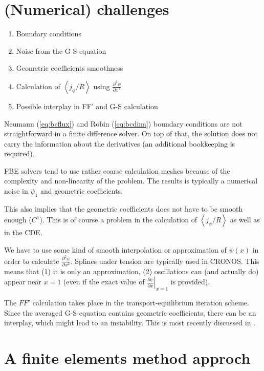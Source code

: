 \section{(Numerical) challenges}

\begin{enumerate}
\item Boundary conditions
\item Noise from the G-S equation
\item Geometric coefficients smoothness
\item Calculation of $\left\langle {{j_\phi }/R} \right\rangle$ using $\frac{{{\partial ^2}\psi }}{{\partial {x^2}}}$
\item Possible interplay in FF' and G-S calculation
\end{enumerate}

Neumann (\ref{eq:bcflux}) and Robin (\ref{eq:bcdina}) boundary conditions
are not straightforward in a finite difference solver. On top of that, the solution
does not carry the information about the derivatives (an additional bookkeeping
is required).

FBE solvers tend to use rather coarse calculation meshes because of the complexity
and non-linearity of the problem. The results is typically a numerical noise in
$\psi_1$ and geometric coefficients.

This also implies that the geometric coefficients does not have to be smooth enough ($C^1$).
This is of course a problem in the calculation of $\left\langle {{j_\phi }/R} \right\rangle$
as well as in the CDE.

We have to use some kind of smooth interpolation or approximation of $\psi\left( x \right)$ 
in order to calculate $\frac{{{\partial ^2}\psi }}{{\partial {x^2}}}$. 
Splines under tension are typically used in CRONOS. This means that (1) it is only
an approximation, (2) oscillations can (and actually do) appear near $x=1$ 
(even if the exact value of
$\left.{\frac{{\partial \psi }}{{\partial x }}} \right|_{x  = 1}$ is provided).

The $FF'$ calculation takes place in the transport-equilibrium iteration scheme. Since
the averaged G-S equation contains geometric coefficients, there can be an interplay,
which might lead to an instability. This is most recently discussed in \cite{FableScheme2013}.

\section{A finite elements method approch}

